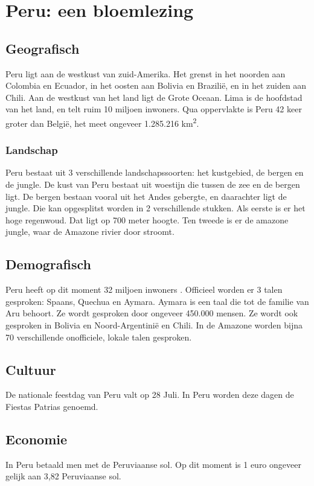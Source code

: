 \section{Peru: een bloemlezing}
\subsection{Geografisch}
Peru ligt aan de westkust van zuid-Amerika. Het grenst in het noorden aan Colombia en Ecuador, in het oosten aan Bolivia en Brazilië, en in het zuiden aan Chili. Aan de westkust van het land ligt de Grote Oceaan. Lima is de hoofdstad van het land, en telt ruim 10 miljoen inwoners. Qua oppervlakte is Peru 42 keer groter dan België, het meet ongeveer 1.285.216 km\textsuperscript{2}. 

\subsubsection{Landschap}
Peru bestaat uit 3 verschillende landschapssoorten: het kustgebied, de bergen en de jungle. De kust van Peru bestaat uit woestijn die tussen de zee en de bergen ligt. De bergen bestaan vooral uit het Andes gebergte, en daarachter ligt de jungle. Die kan opgesplitst worden in 2 verschillende stukken. Als eerste is er het hoge regenwoud. Dat ligt op 700 meter hoogte. Ten tweede is er de amazone jungle, waar de Amazone rivier door stroomt. \autocite{ToPeru2020}

\subsection{Demografisch}
Peru heeft op dit moment 32 miljoen inwoners \autocite{Overheid2020}. Officieel worden er 3 talen gesproken: Spaans, Quechua en Aymara. Aymara is een taal die tot de familie van Aru behoort. Ze wordt gesproken door ongeveer 450.000 mensen. \autocite{CulturaPeru2020} Ze wordt ook gesproken in Bolivia en Noord-Argentinië en Chili. In de Amazone worden bijna 70 verschillende onofficiele, lokale talen gesproken. \autocite{dosmanosperu}

\subsection{Cultuur}
De nationale feestdag van Peru valt op 28 Juli. In Peru worden deze dagen de Fiestas Patrias genoemd. \autocite{dosmanosperu2018} 

\subsection{Economie}
In Peru betaald men met de Peruviaanse sol. Op dit moment is 1 euro ongeveer gelijk aan 3,82 Peruviaanse sol.

